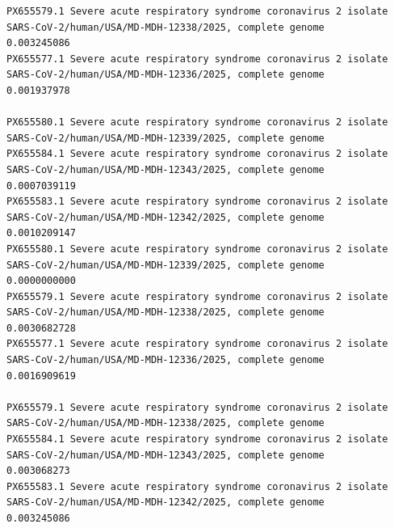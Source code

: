 \documentclass[
  11pt,
]{article}
\newenvironment{rpoutput}{\vspace{0.5em}\begin{snugshade}}{\end{snugshade}}
\begin{document}
\begin{rpoutput}
\begin{verbatim}
PX655579.1 Severe acute respiratory syndrome coronavirus 2 isolate SARS-CoV-2/human/USA/MD-MDH-12338/2025, complete genome                                                                                                                0.003245086
PX655577.1 Severe acute respiratory syndrome coronavirus 2 isolate SARS-CoV-2/human/USA/MD-MDH-12336/2025, complete genome                                                                                                                0.001937978
                                                                                                                           PX655580.1 Severe acute respiratory syndrome coronavirus 2 isolate SARS-CoV-2/human/USA/MD-MDH-12339/2025, complete genome
PX655584.1 Severe acute respiratory syndrome coronavirus 2 isolate SARS-CoV-2/human/USA/MD-MDH-12343/2025, complete genome                                                                                                               0.0007039119
PX655583.1 Severe acute respiratory syndrome coronavirus 2 isolate SARS-CoV-2/human/USA/MD-MDH-12342/2025, complete genome                                                                                                               0.0010209147
PX655580.1 Severe acute respiratory syndrome coronavirus 2 isolate SARS-CoV-2/human/USA/MD-MDH-12339/2025, complete genome                                                                                                               0.0000000000
PX655579.1 Severe acute respiratory syndrome coronavirus 2 isolate SARS-CoV-2/human/USA/MD-MDH-12338/2025, complete genome                                                                                                               0.0030682728
PX655577.1 Severe acute respiratory syndrome coronavirus 2 isolate SARS-CoV-2/human/USA/MD-MDH-12336/2025, complete genome                                                                                                               0.0016909619
                                                                                                                           PX655579.1 Severe acute respiratory syndrome coronavirus 2 isolate SARS-CoV-2/human/USA/MD-MDH-12338/2025, complete genome
PX655584.1 Severe acute respiratory syndrome coronavirus 2 isolate SARS-CoV-2/human/USA/MD-MDH-12343/2025, complete genome                                                                                                                0.003068273
PX655583.1 Severe acute respiratory syndrome coronavirus 2 isolate SARS-CoV-2/human/USA/MD-MDH-12342/2025, complete genome                                                                                                                0.003245086

\end{verbatim}
\end{rpoutput}
\end{document}
